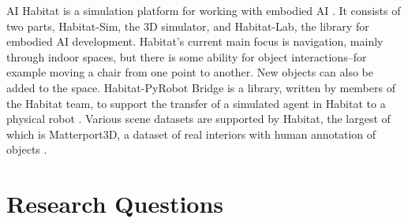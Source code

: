 AI Habitat is a simulation platform for working with embodied AI \cite{habitat19iccv}. It consists of two parts, Habitat-Sim, the 3D simulator, and Habitat-Lab, the library for embodied AI development. Habitat's current main focus is navigation, mainly through indoor spaces, but there is some ability for object interactions--for example moving a chair from one point to another. New objects can also be added to the space. Habitat-PyRobot Bridge is a library, written by members of the Habitat team, to support the transfer of a simulated agent in Habitat to a physical robot \cite{Kadian_2020}. Various scene datasets are supported by Habitat, the largest of which is Matterport3D, a dataset of real interiors with human annotation of objects \cite{matterport}.



\section{Research Questions}






